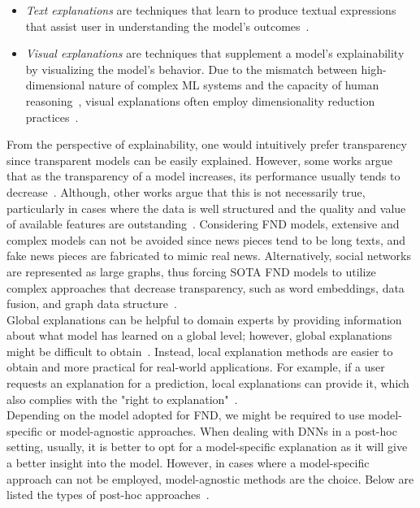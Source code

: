\begin{itemize}
    \item \emph{Text explanations} are techniques that learn to produce textual expressions that assist user in understanding the model's outcomes~\parencite{TowardsExplainableNeuralSymbolic_Bennetot}.
    \item \emph{Visual explanations} are techniques that supplement a model's explainability by visualizing the model's behavior. Due to the mismatch between high-dimensional nature of  complex ML systems and the capacity of human reasoning~\parencite{HowTheMachineThinks_Burrell}, visual explanations often employ dimensionality reduction practices~\parencite{XAIConceptsTaxonomies_Arrieta}.
\end{itemize}
From the perspective of explainability, one would intuitively prefer transparency since transparent models
can be easily explained. However, some works argue that as the transparency of a model increases, its performance usually tends to decrease~\parencite{ExplaniableAIASurvey_Dosilovic}. Although, other works argue that this is not necessarily true, particularly in cases where the data is well structured and the quality and value of available features are outstanding~\parencite{StopExplainingBlackBoxmodels_Rudin}. Considering FND models, extensive and complex models can not be avoided since news pieces tend to be long texts, and fake news pieces are fabricated to mimic real news. Alternatively, social networks are represented as large graphs, thus forcing SOTA FND models to utilize complex approaches that decrease transparency, such as word embeddings, data fusion, and graph data structure~\parencite{UPFD_Dataset_Shu}.\\
Global explanations can be helpful to domain experts by providing information about what model has learned on a global level; however, global explanations might be difficult to obtain~\parencite{TheMythosOfModelInterpretability_Lipton}. Instead, local explanation methods are easier to obtain and more practical for real-world applications. For example, if a user requests an explanation for a prediction, local explanations can provide it, which also complies with the "right to explanation"~\parencite{EURegulationsOnDecisionMaking_Goodman}.\\
Depending on the model adopted for FND, we might be required to use model-specific or model-agnostic approaches. When dealing with DNNs in a post-hoc setting, usually, it is better to opt for a model-specific explanation as it will give a better insight into the model. However, in cases where a model-specific approach can not be employed, model-agnostic methods are the choice. Below are listed the types of post-hoc approaches~\parencite{XAIConceptsTaxonomies_Arrieta}.
